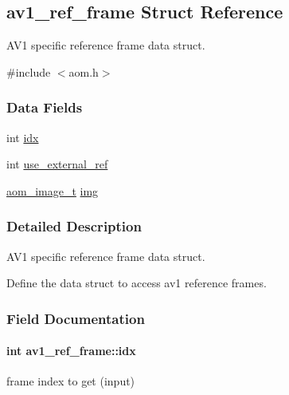 \hypertarget{structav1__ref__frame}{}\subsection{av1\+\_\+ref\+\_\+frame Struct Reference}
\label{structav1__ref__frame}


A\+V1 specific reference frame data struct.  




{\ttfamily \#include $<$aom.\+h$>$}

\subsubsection*{Data Fields}
\begin{DoxyCompactItemize}
\item 
int \hyperlink{structav1__ref__frame_a7c6fcaba58f514985448cb2e2245345c}{idx}
\item 
int \hyperlink{structav1__ref__frame_a33749c5c20033cc5f7582d0ec1c34ff0}{use\+\_\+external\+\_\+ref}
\item 
\hyperlink{aom__image_8h_a5409ae8fdb326fe1cc32622ef4e23748}{aom\+\_\+image\+\_\+t} \hyperlink{structav1__ref__frame_a55a09db9e1acdd73e656b01fa01283b3}{img}
\end{DoxyCompactItemize}


\subsubsection{Detailed Description}
A\+V1 specific reference frame data struct. 

Define the data struct to access av1 reference frames. 

\subsubsection{Field Documentation}
\paragraph[{\texorpdfstring{idx}{idx}}]{\setlength{\rightskip}{0pt plus 5cm}int av1\+\_\+ref\+\_\+frame\+::idx}\hypertarget{structav1__ref__frame_a7c6fcaba58f514985448cb2e2245345c}{}\label{structav1__ref__frame_a7c6fcaba58f514985448cb2e2245345c}
frame index to get (input) 
